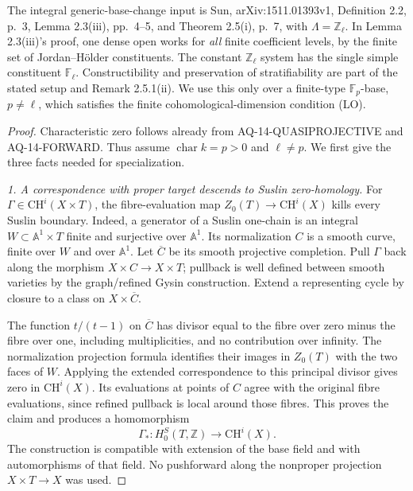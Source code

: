 The integral generic-base-change input is Sun,
arXiv:1511.01393v1, Definition 2.2, p.~3, Lemma 2.3(iii),
pp.~4--5, and Theorem 2.5(i), p.~7, with
$\Lambda=\mathbb Z_\ell$. In Lemma 2.3(iii)'s proof, one
dense open works for \emph{all} finite coefficient levels,
by the finite set of Jordan--H\"older constituents. The
constant $\mathbb Z_\ell$ system has the single simple
constituent $\mathbb F_\ell$. Constructibility and preservation
of stratifiability are part of the stated setup and
Remark 2.5.1(ii). We use this only over a finite-type
$\mathbb F_p$-base, $p\ne\ell$, which satisfies the finite
cohomological-dimension condition (LO).

\begin{proof}
Characteristic zero follows already from
AQ-14-QUASIPROJECTIVE and AQ-14-FORWARD. Thus assume
$\operatorname{char}k=p>0$ and $\ell\ne p$.
We first give the three facts needed for specialization.

\emph{1. A correspondence with proper target descends to
Suslin zero-homology.}
For $\Gamma\in\mathrm{CH}^i(X\times T)$, the fibre-evaluation
map $Z_0(T)\to\mathrm{CH}^i(X)$ kills every Suslin boundary.
Indeed, a generator of a Suslin one-chain is an integral
$W\subset\mathbb A^1\times T$ finite and surjective over
$\mathbb A^1$. Its normalization $C$ is a smooth curve,
finite over $W$ and over $\mathbb A^1$. Let $\overline C$
be its smooth projective completion. Pull $\Gamma$ back
along the morphism $X\times C\to X\times T$; pullback is
well defined between smooth varieties by the graph/refined
Gysin construction. Extend a representing cycle by closure
to a class on $X\times\overline C$.

The function $t/(t-1)$ on $\overline C$ has divisor equal
to the fibre over zero minus the fibre over one, including
multiplicities, and no contribution over infinity. The
normalization projection formula identifies their images
in $Z_0(T)$ with the two faces of $W$. Applying the extended
correspondence to this principal divisor gives zero in
$\mathrm{CH}^i(X)$. Its evaluations at points of $C$ agree
with the original fibre evaluations, since refined pullback
is local around those fibres. This proves the claim and
produces a homomorphism
\[
 \Gamma_*:H_0^S(T,\mathbb Z)\longrightarrow\mathrm{CH}^i(X).
                                                               \tag{AQ.14.4}
\]
The construction is compatible with extension of the base
field and with automorphisms of that field. No pushforward
along the nonproper projection $X\times T\to X$ was used.


\end{proof}

